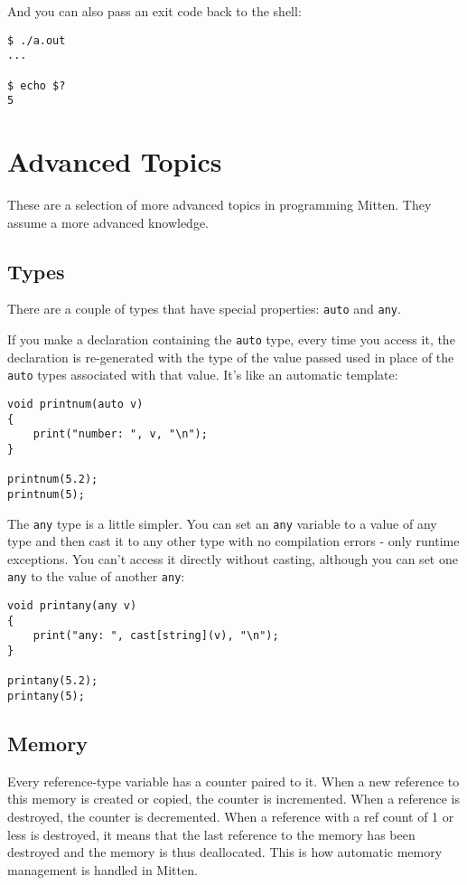 \documentclass[10pt,a4paper]{article}
\begin{document}
And you can also pass an exit code back to the shell:
\begin{verbatim}
$ ./a.out
...

$ echo $?
5
\end{verbatim}

\newpage







\section{Advanced Topics}
These are a selection of more advanced topics in programming Mitten. They assume a more advanced knowledge.

\subsection{Types}
There are a couple of types that have special properties: \verb|auto| and \verb|any|.

If you make a declaration containing the \verb|auto| type, every time you access it, the declaration is re-generated with the type of the value passed used in place of the \verb|auto| types associated with that value. It's like an automatic template:
\begin{verbatim}
void printnum(auto v)
{
    print("number: ", v, "\n");
}

printnum(5.2);
printnum(5);
\end{verbatim}

The \verb|any| type is a little simpler. You can set an \verb|any| variable to a value of any type and then cast it to any other type with no compilation errors - only runtime exceptions. You can't access it directly without casting, although you can set one \verb|any| to the value of another \verb|any|:
\begin{verbatim}
void printany(any v)
{
    print("any: ", cast[string](v), "\n");
}

printany(5.2);
printany(5);
\end{verbatim}

\newpage



\subsection{Memory}
Every reference-type variable has a counter paired to it. When a new reference to this memory is created or copied, the counter is incremented. When a reference is destroyed, the counter is decremented. When a reference with a ref count of 1 or less is destroyed, it means that the last reference to the memory has been destroyed and the memory is thus deallocated. This is how automatic memory management is handled in Mitten.
\end{document}
